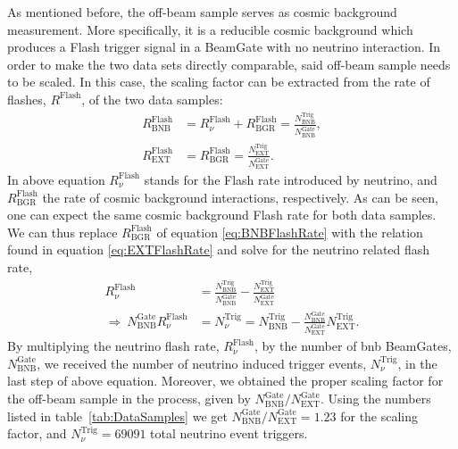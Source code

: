 As mentioned before, the off-beam sample serves as cosmic background measurement. More specifically, it is a reducible cosmic background which produces a \gls{Flash} trigger signal in a \gls{BeamGate} with no neutrino interaction. In order to make the two data sets directly comparable, said off-beam sample needs to be scaled. In this case, the scaling factor can be extracted from the rate of flashes, $R^\text{Flash}$, of the two data samples:
\begin{align} \label{eq:BNBFlashRate}
    R^\text{Flash}_\text{BNB} &= R^\text{Flash}_\nu + R^\text{Flash}_\text{BGR} = \frac{N^\text{Trig}_\text{BNB}}{N^\text{Gate}_\text{BNB}}, \\
    R^\text{Flash}_\text{EXT} &= R^\text{Flash}_\text{BGR} = \frac{N^\text{Trig}_\text{EXT}}{N^\text{Gate}_\text{EXT}}.
    \label{eq:EXTFlashRate}
\end{align}
In above equation $R^\text{Flash}_\nu$ stands for the \gls{Flash} rate introduced by neutrino, and $R^\text{Flash}_\text{BGR}$ the rate of cosmic background interactions, respectively. As can be seen, one can expect the same cosmic background \gls{Flash} rate for both data samples. We can thus replace $R^\text{Flash}_\text{BGR}$ of equation \ref{eq:BNBFlashRate} with the relation found in equation \ref{eq:EXTFlashRate} and solve for the neutrino related flash rate,
\begin{align}
    R^\text{Flash}_\nu &= \frac{N^\text{Trig}_\text{BNB}}{N^\text{Gate}_\text{BNB}} - \frac{N^\text{Trig}_\text{EXT}}{N^\text{Gate}_\text{EXT}} \nonumber \\
    \Longrightarrow \ N^\text{Gate}_\text{BNB} R^\text{Flash}_\nu &= N^\text{Trig}_\nu = N^\text{Trig}_\text{BNB} - \frac{N^\text{Gate}_\text{BNB}}{N^\text{Gate}_\text{EXT}} N^\text{Trig}_\text{EXT}.
    \label{eq:NumberOfNu}
\end{align}
By multiplying the neutrino flash rate, $R^\text{Flash}_\nu$, by the number of \gls{bnb} \glspl{BeamGate}, $N^\text{Gate}_\text{BNB}$, we received the number of neutrino induced trigger events, $N^\text{Trig}_\nu$, in the last step of above equation. Moreover, we obtained the proper scaling factor for the off-beam sample in the process, given by $N^\text{Gate}_\text{BNB} / N^\text{Gate}_\text{EXT}$. Using the numbers listed in table~\ref{tab:DataSamples} we get $N^\text{Gate}_\text{BNB} / N^\text{Gate}_\text{EXT} = \num{1.23}$ for the scaling factor, and $N^\text{Trig}_\nu = \num{69091}$ total neutrino event triggers.

